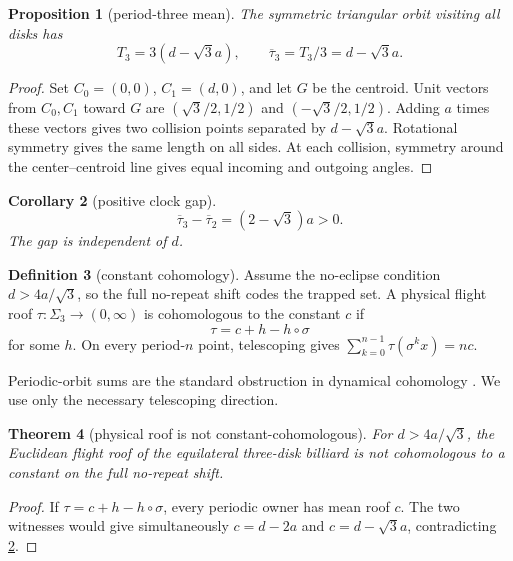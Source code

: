 \documentclass[11pt,a4paper]{article}
\newtheorem{theorem}{Theorem}[section]
\newtheorem{proposition}[theorem]{Proposition}
\newtheorem{corollary}[theorem]{Corollary}
\theoremstyle{definition}
\newtheorem{definition}[theorem]{Definition}
\theoremstyle{remark}
\begin{document}
\begin{proposition}[period-three mean]\label{prop:t3}
The symmetric triangular orbit visiting all disks has
\[
 T_3=3(d-\sqrt3a),\qquad \overline{\tau}_3=T_3/3=d-\sqrt3a.
\]
\end{proposition}
\begin{proof}
Set \(C_0=(0,0)\), \(C_1=(d,0)\), and let \(G\) be the centroid. Unit vectors from \(C_0,C_1\) toward \(G\) are
\((\sqrt3/2,1/2)\) and \((-\sqrt3/2,1/2)\). Adding \(a\) times these vectors gives two collision points separated by \(d-\sqrt3a\). Rotational symmetry gives the same length on all sides. At each collision, symmetry around the center--centroid line gives equal incoming and outgoing angles.
\end{proof}

\begin{corollary}[positive clock gap]\label{cor:gap}
\[
 \overline{\tau}_3-\overline{\tau}_2=(2-\sqrt3)a>0.
\]
The gap is independent of \(d\).
\end{corollary}

\begin{definition}[constant cohomology]
Assume the no-eclipse condition \(d>4a/\sqrt3\), so the full no-repeat shift
codes the trapped set.  A physical flight roof
\(\tau:\Sigma_3\to(0,\infty)\) is cohomologous to the constant \(c\) if
\[
 \tau=c+h-h\circ\sigma
\]
for some \(h\). On every period-\(n\) point, telescoping gives
\(\sum_{k=0}^{n-1}\tau(\sigma^kx)=nc\).
\end{definition}

Periodic-orbit sums are the standard obstruction in dynamical cohomology \citep[main cohomology criteria]{Livsic1972}. We use only the necessary telescoping direction.

\begin{theorem}[physical roof is not constant-cohomologous]\label{thm:noncohom}
For \(d>4a/\sqrt3\), the Euclidean flight roof of the equilateral three-disk
billiard is not cohomologous to a constant on the full no-repeat shift.
\end{theorem}
\begin{proof}
If \(\tau=c+h-h\circ\sigma\), every periodic owner has mean roof \(c\). The two witnesses would give simultaneously \(c=d-2a\) and \(c=d-\sqrt3a\), contradicting \cref{cor:gap}.
\end{proof}
\end{document}
